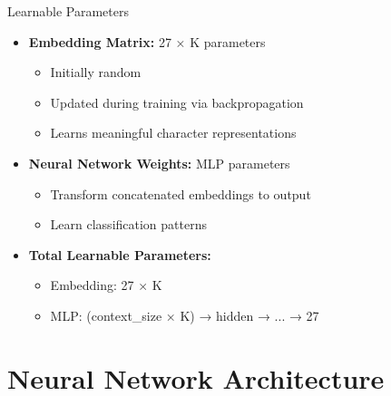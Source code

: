 \documentclass[usenames,dvipsnames]{beamer}
\begin{document}
\begin{frame}{Learnable Parameters}
\begin{itemize}[<+->]
\item \textbf{Embedding Matrix:} 27 × K parameters
\begin{itemize}
\item Initially random
\item Updated during training via backpropagation
\item Learns meaningful character representations
\end{itemize}

\item \textbf{Neural Network Weights:} MLP parameters
\begin{itemize}
\item Transform concatenated embeddings to output
\item Learn classification patterns
\end{itemize}

\item \textbf{Total Learnable Parameters:}
\begin{itemize}
\item Embedding: 27 × K
\item MLP: (context\_size × K) → hidden → ... → 27
\end{itemize}
\end{itemize}
\end{frame}

\section{Neural Network Architecture}
\end{document}
